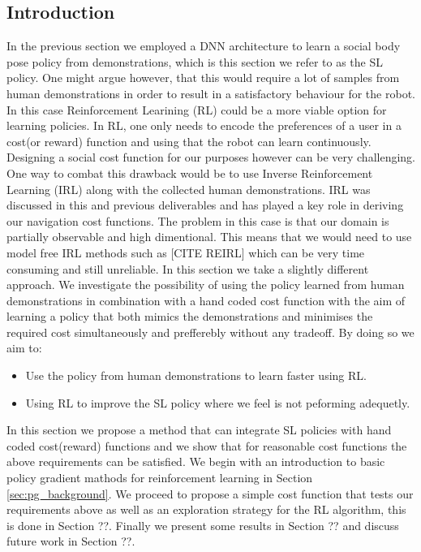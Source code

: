 \documentclass[a4paper,11pt]{report}
\begin{document}
\subsection{Introduction}
In the previous section we employed a DNN architecture to learn a social body pose policy from demonstrations, which is this section we refer to as the SL policy. One might argue however, that this would require a lot of samples from human demonstrations in order to result in a satisfactory behaviour for the robot. In this case Reinforcement Learining (RL) could be a more viable option for learning policies. In RL, one only needs to encode the preferences of a user in a cost(or reward) function and using that the robot can learn continuously. Designing a social cost function for our purposes however can be very challenging. One way to combat this drawback would be to use Inverse Reinforcement Learning (IRL) along with the collected human demonstrations. IRL was discussed in this and previous deliverables and has played a key role in deriving our navigation cost functions. The problem in this case is that our domain is partially observable and high dimentional. This means that we would need to use model free IRL methods such as [CITE REIRL] which can be very time consuming and still unreliable. In this section we take a slightly different approach. We investigate the possibility of using the policy learned from human demonstrations in combination with a hand coded cost function with the aim of learning a policy that both mimics the demonstrations and minimises the required cost simultaneously and prefferebly without any tradeoff. By doing so we aim to:

\begin{itemize}
	\item Use the policy from human demonstrations to learn faster using RL.
	\item Using RL to improve the SL policy where we feel is not peforming adequetly.   
\end{itemize}

In this section we propose a method that can integrate SL policies with hand coded cost(reward) functions and we show that for reasonable cost functions the above requirements can be satisfied. We begin with an introduction to basic policy gradient mathods for reinforcement learning in Section \ref{sec:pg_background}. We proceed to propose a simple cost function that tests our requirements above as well as an exploration strategy for the RL algorithm, this is done in Section ??. Finally we present some results in Section ?? and discuss future work in Section ??.
\end{document}
